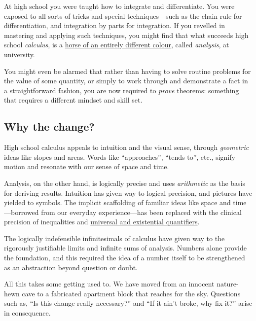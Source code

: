 \documentclass[
  a4paper,
]{article}
\begin{document}
At high school you were taught how to integrate and differentiate. You
were exposed to all sorts of tricks and special techniques---such as the
chain rule for differentiation, and integration by parts for
integration. If you revelled in mastering and applying such techniques,
you might find that what succeeds high school \emph{calculus}, is a
\href{https://www.dictionary.com/browse/a-horse-of-a-different-color}{horse
of an entirely different colour}, called \emph{analysis}, at university.

You might even be alarmed that rather than having to solve routine
problems for the value of some quantity, or simply to work through and
demonstrate a fact in a straightforward fashion, you are now required to
\emph{prove} theorems: something that requires a different mindset and
skill set.

\subsection{Why the change?}\label{why-the-change}

High school calculus appeals to intuition and the visual sense, through
\emph{geometric} ideas like slopes and areas. Words like ``approaches'',
``tends to'', etc., signify motion and resonate with our sense of space
and time.

Analysis, on the other hand, is logically precise and uses
\emph{arithmetic} as the basis for deriving results. Intuition has given
way to logical precision, and pictures have yielded to symbols. The
implicit scaffolding of familiar ideas like space and time---borrowed
from our everyday experience---has been replaced with the clinical
precision of inequalities and
\href{https://math.libretexts.org/Bookshelves/Mathematical_Logic_and_Proof/Book\%3A_Mathematical_Reasoning__Writing_and_Proof_(Sundstrom)/02\%3A_Logical_Reasoning/2.04\%3A_Quantifiers_and_Negations}{universal
and existential quantifiers}.

The logically indefensible infinitesimals of calculus have given way to
the rigorously justifiable limits and infinite sums of analysis. Numbers
alone provide the foundation, and this required the idea of a number
itself to be strengthened as an abstraction beyond question or doubt.

All this takes some getting used to. We have moved from an innocent
nature-hewn cave to a fabricated apartment block that reaches for the
sky. Questions such as, ``Is this change really necessary?'' and ``If it
ain't broke, why fix it?'' arise in consequence.
\end{document}
